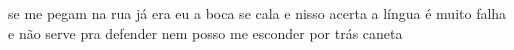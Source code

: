 \begin{poem}
\begin{stanza}
se me pegam na rua\verseline
já era eu\verseline
\qquad a boca se cala\verseline
\qquad e nisso acerta\verseline
a língua é muito falha\verseline
e não serve\verseline
pra defender\verseline
\qquad nem posso me esconder\verseline
\qquad por trás caneta
\end{stanza}
\end{poem}